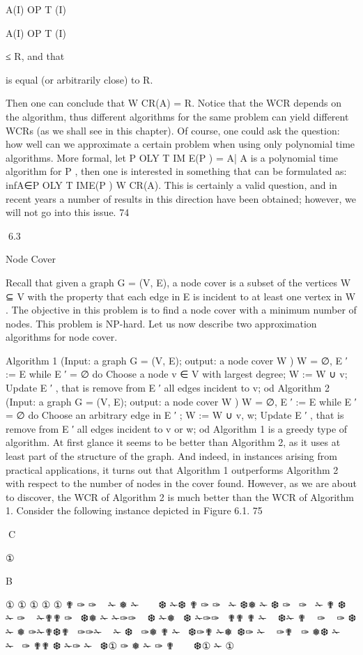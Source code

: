 \documentclass[titlepage]{book}
\theoremstyle{plain}
\theoremstyle{definition}
\theoremstyle{remark}
\begin{document}
A(I)
OP T (I)

A(I)
OP T (I)

≤ R, and that

is equal (or arbitrarily close) to R.

Then one can conclude that W CR(A) = R. Notice that the WCR depends on the algorithm, thus different
algorithms for the same problem can yield different WCRs (as we shall see in this chapter). Of course, one
could ask the question: how well can we approximate a certain problem when using only polynomial time
algorithms. More formal, let P OLY T IM E(P ) = {A| A is a polynomial time algorithm for P }, then one
is interested in something that can be formulated as:
infA∈P OLY T IME(P ) W CR(A).
This is certainly a valid question, and in recent years a number of results in this direction have been
obtained; however, we will not go into this issue.
74

6.3

Node Cover

Recall that given a graph G = (V, E), a node cover is a subset of the vertices W ⊆ V with the property
that each edge in E is incident to at least one vertex in W . The objective in this problem is to find
a node cover with a minimum number of nodes. This problem is NP-hard. Let us now describe two
approximation algorithms for node cover.

Algorithm 1 (Input: a graph G = (V, E); output: a node cover W )
W = ∅, E ′ := E
while E ′ = ∅
do
Choose a node v ∈ V with largest degree;
W := W ∪ {v};
Update E ′ , that is remove from E ′ all edges incident to v;
od
Algorithm 2 (Input: a graph G = (V, E); output: a node cover W )
W = ∅, E ′ := E
while E ′ = ∅
do
Choose an arbitrary edge in E ′ ;
W := W ∪ {v, w};
Update E ′ , that is remove from E ′ all edges incident to v or w;
od
Algorithm 1 is a greedy type of algorithm. At first glance it seems to be better than Algorithm 2, as it uses
at least part of the structure of the graph. And indeed, in instances arising from practical applications,
it turns out that Algorithm 1 outperforms Algorithm 2 with respect to the number of nodes in the cover
found. However, as we are about to discover, the WCR of Algorithm 2 is much better than the WCR of
Algorithm 1.
Consider the following instance depicted in Figure 6.1.
75

C

①

B

①
①
①
①
①
✟
✑
✑
 
✁
❅
✁
 
 
❆
✁❆
✟
✑
✑
 ✁
❆❅
✁ ❆
✑ 
✑  ✁ ✟
❆   ✁ ✑   ✁✟✟
✑ 
❆❅ ✁
✁✑✑  
❆ ✁❅  ❆ ✁✑✑  ✟✟
✟
✁  
❆✁ ✟
  ✑
  ✑
❆✁ ❅
✑✁✟❆✟
 ✑✑✁  
✁ ❆  ✑❅
✟
✁  ❆✑✟ ✁❅ ❆✑ ✁  
✑✟  ✑
❅❆ ✁ 
✁ 
✑
✟✟ ❆ ✁✑
✁ 
❆①
✑
❅
✁
✑
✟
 
 
❆①
✁
①
\end{document}
